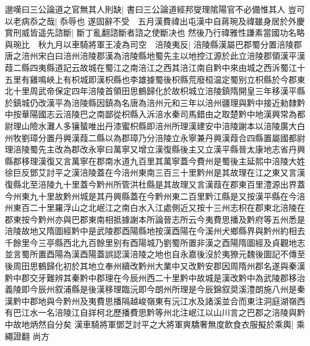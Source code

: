 邈嘆曰三公論道之官無其人則缺|{
	書曰三公論道經邦燮理隂陽官不必備惟其人}
豈可以老病忝之哉|{
	忝辱也}
遂固辭不受　五月漢費禕出屯漢中自蔣琬及禕雖身居於外慶賞刑威皆遥先諮斷|{
	斷丁亂翻諮斷者諮之使斷决也}
然後乃行禕雅性謙素當國功名略與琬比　秋九月以車騎將軍王凌為司空　涪陵夷反|{
	涪陵縣漢屬巴郡蜀分置涪陵郡唐之涪州宋白曰涪州涪陵郡漢為涪陵縣地蜀先主以地控江源於此立涪陵郡領漢平漢葭二縣四夷縣道記云故城在蜀江之南涪江之西其涪江南自黔中來由城之西泝蜀江十五里有雞鳴峽上有枳城即漢枳縣也李雄據蜀後枳縣荒廢桓温定蜀别立枳縣於今郡東北十里周武帝保定四年涪陵首領田思鶴歸化於故枳城立涪陵鎮隋開皇三年移漢平縣於鎮城仍改漢平為涪陵縣因鎮為名唐為涪州元和三年以涪州疆理與黔中接近勑隸黔中按華陽國志云涪陵巴之南鄙從枳縣入泝涪水秦司馬錯由之取楚黔中地漢興常為都尉理山險水灘人多獽蜑唯出丹漆蜜枳縣即涪州所理漢建安中涪陵謝本以涪陵廣大白州牧劉璋分置丹興漢葭二縣以為郡璋乃分涪陵立永寧兼丹興漢葭合四縣置屬國都尉理涪陵蜀先主改為郡改永寧曰萬寧又增立漢復縣後主又立漢平縣晉太康地志省丹興縣郡移理漢復又言萬寧在郡南水道九百里其萬寧蓋今費州是蜀後主延熙中涪陵大姓徐巨反鄧艾討平之漢涪陵蓋在今涪州東南三百三十里黔州是其故理在江之東又言漢復縣北至涪陵九十里蓋今黔州所管洪杜縣是其故理又言漢葭在郡東百里澧源出界蓋今州東九十里故黔州城是其丹興縣蓋在今黔州東二百里黔江縣是又按漢平縣在今涪州東百二十里羅浮山之北岷江之南白水入江處側近又按十三州志枳在郡東北涪陵在郡東按今黔州亦與巴郡東南相抵據謝本所論晉志所云今夷費思播及黔府等五州悉是涪陵故地又隋圖經黔中是武陵郡酉陽縣地按漢酉陽在今溪州犬鄉縣界與黔州約相去千餘里今三亭縣西北九百餘里别有酉陽城乃劉蜀所置非漢之酉陽隋圖經及貞觀地志並言蜀所置酉陽為漢酉陽蓋誤認漢涪陵之地也自永嘉後沒於夷獠元魏後圖記不傳至後周田思鶴歸化初於其地立奉州續改黔州大業中又改黔安郡因周隋州郡名遂與秦漢黔中郡交牙難辨其秦黔中郡理在今辰州西二十里黔中故城是漢改黔中為武陵郡移治義陵即今辰州叙浦縣是後漢移理臨沅即今朗州所理是今辰錦叙奨溪澧朗施八州是秦漢黔中郡地與今黔州及夷費思播隔越峻嶺東有沅江水及諸溪並合而東注洞庭湖嶺西有巴江水一名涪陵江自牂柯北歷播費思黔等州北注岷江以山川言之巴郡之涪陵與黔中故地炳然自分矣}
漢車騎將軍鄧芝討平之大將軍爽驕奢無度飲食衣服擬於乘輿|{
	乘繩證翻}
尚方

